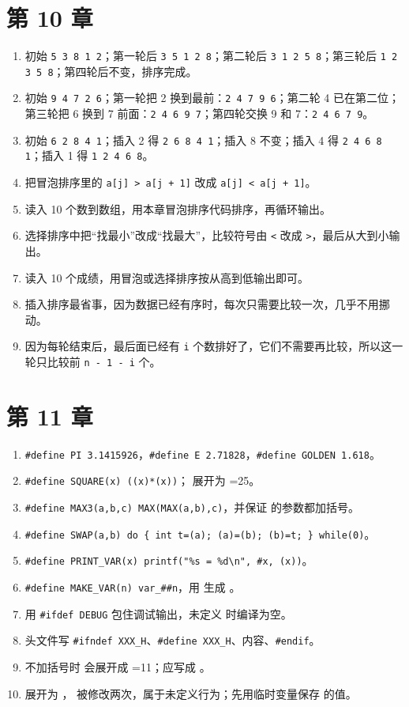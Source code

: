 \section{第 10 章}

\begin{enumerate}
  \item 初始 \texttt{5 3 8 1 2}；第一轮后 \texttt{3 5 1 2 8}；第二轮后 \texttt{3 1 2 5 8}；第三轮后 \texttt{1 2 3 5 8}；第四轮后不变，排序完成。
  \item 初始 \texttt{9 4 7 2 6}；第一轮把 2 换到最前：\texttt{2 4 7 9 6}；第二轮 4 已在第二位；第三轮把 6 换到 7 前面：\texttt{2 4 6 9 7}；第四轮交换 9 和 7：\texttt{2 4 6 7 9}。
  \item 初始 \texttt{6 2 8 4 1}；插入 2 得 \texttt{2 6 8 4 1}；插入 8 不变；插入 4 得 \texttt{2 4 6 8 1}；插入 1 得 \texttt{1 2 4 6 8}。
  \item 把冒泡排序里的 \texttt{a[j] > a[j + 1]} 改成 \texttt{a[j] < a[j + 1]}。
  \item 读入 10 个数到数组，用本章冒泡排序代码排序，再循环输出。
  \item 选择排序中把“找最小”改成“找最大”，比较符号由 \texttt{<} 改成 \texttt{>}，最后从大到小输出。
  \item 读入 10 个成绩，用冒泡或选择排序按从高到低输出即可。
  \item 插入排序最省事，因为数据已经有序时，每次只需要比较一次，几乎不用挪动。
  \item 因为每轮结束后，最后面已经有 \texttt{i} 个数排好了，它们不需要再比较，所以这一轮只比较前 \texttt{n - 1 - i} 个。
\end{enumerate}
\section{第 11 章}

\begin{enumerate}
  \item \texttt{\#define PI 3.1415926}，\texttt{\#define E 2.71828}，\texttt{\#define GOLDEN 1.618}。
  \item \texttt{\#define SQUARE(x) ((x)*(x))}； 展开为 =25。
  \item \texttt{\#define MAX3(a,b,c) MAX(MAX(a,b),c)}，并保证  的参数都加括号。
  \item \texttt{\#define SWAP(a,b) do \{ int t=(a); (a)=(b); (b)=t; \} while(0)}。
  \item \texttt{\#define PRINT\_VAR(x) printf("\%s = \%d\textbackslash n", \#x, (x))}。
  \item \texttt{\#define MAKE\_VAR(n) var\_\#\#n}，用  生成 。
  \item 用 \texttt{\#ifdef DEBUG} 包住调试输出，未定义  时编译为空。
  \item 头文件写 \texttt{\#ifndef XXX\_H}、\texttt{\#define XXX\_H}、内容、\texttt{\#endif}。
  \item 不加括号时  会展开成 =11；应写成 。
  \item {} 展开为 ， 被修改两次，属于未定义行为；先用临时变量保存  的值。
\end{enumerate}
